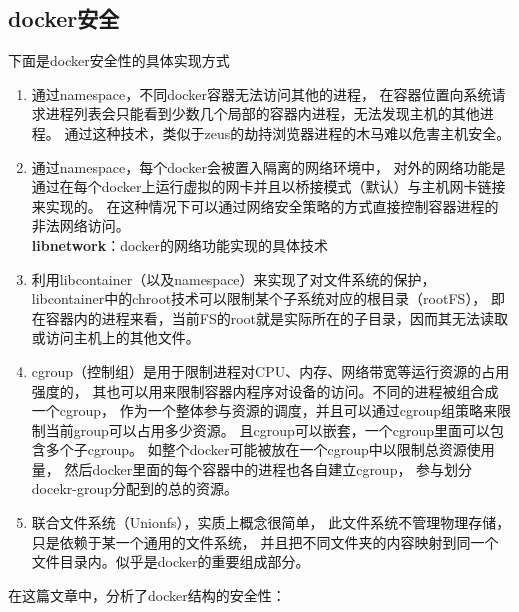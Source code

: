 \documentclass[AutoFakeBold,a4paper]{ctexart}
\begin{document}
\subsection{docker安全}
下面是docker安全性的具体实现方式\cite{boettiger2015introduction} \cite{rad2017introduction}

\begin{enumerate}
    \item 通过namespace，不同docker容器无法访问其他的进程，
    在容器位置向系统请求进程列表会只能看到少数几个局部的容器内进程，无法发现主机的其他进程。
    通过这种技术，类似于zeus的劫持浏览器进程的木马难以危害主机安全。
    
    \item 通过namespace，每个docker会被置入隔离的网络环境中，
    对外的网络功能是通过在每个docker上运行虚拟的网卡并且以桥接模式（默认）与主机网卡链接来实现的。
    在这种情况下可以通过网络安全策略的方式直接控制容器进程的非法网络访问。\\
    \textbf{libnetwork}：docker的网络功能实现的具体技术
    
    \item 利用libcontainer（以及namespace）来实现了对文件系统的保护，
    libcontainer中的chroot技术可以限制某个子系统对应的根目录（rootFS），
    即在容器内的进程来看，当前FS的root就是实际所在的子目录，因而其无法读取或访问主机上的其他文件。
    
    \item cgroup（控制组）是用于限制进程对CPU、内存、网络带宽等运行资源的占用强度的，
    其也可以用来限制容器内程序对设备的访问。不同的进程被组合成一个cgroup，
    作为一个整体参与资源的调度，并且可以通过cgroup组策略来限制当前group可以占用多少资源。
    且cgroup可以嵌套，一个cgroup里面可以包含多个子cgroup。
    如整个docker可能被放在一个cgroup中以限制总资源使用量，
    然后docker里面的每个容器中的进程也各自建立cgroup，
    参与划分docekr-group分配到的总的资源。
    
    \item 联合文件系统（Unionfs），实质上概念很简单，
    此文件系统不管理物理存储，只是依赖于某一个通用的文件系统，
    并且把不同文件夹的内容映射到同一个文件目录内。似乎是docker的重要组成部分。
\end{enumerate}

在这篇文章中，分析了docker结构的安全性：\cite{bui2015analysis}
\end{document}

